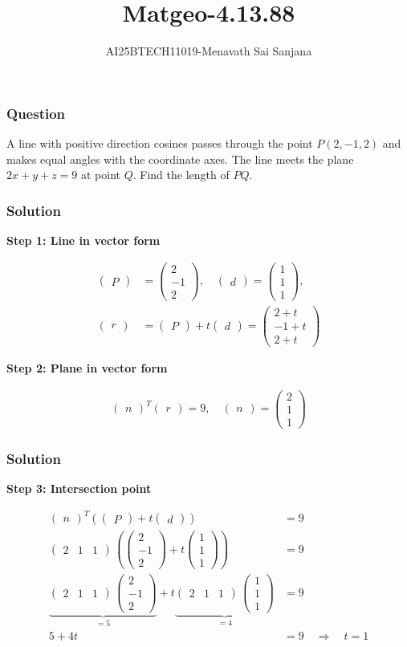 \documentclass{beamer}
\title{Matgeo-4.13.88}
\author{AI25BTECH11019-Menavath Sai Sanjana}
\date{}
\theoremstyle{remark}
\renewcommand{\vec}[1]{\begin{pmatrix}#1\end{pmatrix}}
\begin{document}
\begin{frame}
\titlepage
\end{frame}

\begin{frame}
\frametitle{Question}
A line with positive direction cosines passes through the point 
$P(2,-1,2)$ and makes equal angles with the coordinate axes.  
The line meets the plane $2x+y+z=9$ at point $Q$.  
Find the length of $PQ$.  

\end{frame}

\begin{frame}
\frametitle{Solution}

\textbf{Step 1: Line in vector form}

\begin{align}
\vec{P} &= \vec{2\\-1\\2}, \quad
\vec{d} = \vec{1\\1\\1}, \\
\vec{r} &= \vec{P} + t\vec{d} = \vec{2+t\\-1+t\\2+t}
\end{align}

\textbf{Step 2: Plane in vector form}

\begin{align}
\vec{n}^T \vec{r} = 9, \quad
\vec{n} = \vec{2\\1\\1}
\end{align}
\end{frame}

\begin{frame}
\frametitle{Solution}
\textbf{Step 3: Intersection point}

\begin{align}
\vec{n}^T (\vec{P} + t \vec{d}) &= 9 \\
\vec{2 & 1 & 1} \, (\vec{2\\-1\\2} + t \vec{1\\1\\1}) &= 9 \\
\underbrace{\vec{2 & 1 & 1} \, \vec{2\\-1\\2}}_{=5} + 
t \underbrace{\vec{2 & 1 & 1} \, \vec{1\\1\\1}}_{=4} &= 9 \\
5 + 4t &= 9 \quad \Rightarrow \quad t = 1 \\
\end{align}
\end{frame}
\end{document}
